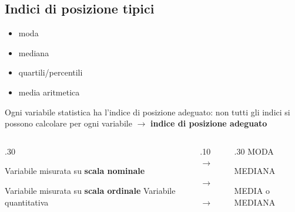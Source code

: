 \documentclass[compress]{beamer}
\begin{document}
\subsection{Indici di posizione tipici}

\begin{frame}

\begin{itemize}
	\item moda
	\item mediana
	\item quartili/percentili
	\item media aritmetica
\end{itemize}

	Ogni variabile statistica ha l’indice di posizione adeguato: non tutti gli indici si possono calcolare per ogni variabile $\rightarrow$ \textbf{indice di posizione adeguato}
\end{frame}


\begin{frame}
	
	\begin{columns}
\begin{column}{.30\linewidth}

Variabile misurata su \textbf{scala nominale}

	\vspace{3mm}

Variabile misurata su \textbf{scala ordinale}
		\vspace{3mm}
Variabile quantitativa
	\end{column}

\begin{column}{.10\linewidth}
	$\rightarrow$
	
		\vspace{3mm}
	$\rightarrow$ 
	
		\vspace{3mm}
	$\rightarrow$  
\end{column}

\begin{column}{.30\linewidth}
	MODA
	
		\vspace{3mm}
	MEDIANA
	
		\vspace{3mm}
	MEDIA 	o MEDIANA
\end{column}


	\end{columns}

\end{frame}
\end{document}
